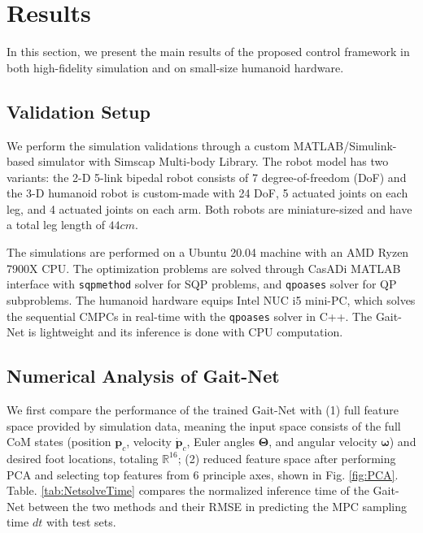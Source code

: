 \section{Results}
\label{sec:Results}

In this section, we present the main results of the proposed control framework in both high-fidelity simulation and on small-size humanoid hardware. 

\subsection{Validation Setup}
We perform the simulation validations through a custom MATLAB/Simulink-based simulator with Simscap Multi-body Library. The robot model has two variants: the 2-D 5-link bipedal robot consists of 7 degree-of-freedom (DoF) and the 3-D humanoid robot is custom-made with 24 DoF, 5 actuated joints on each leg, and 4 actuated joints on each arm. Both robots are miniature-sized and have a total leg length of $44 \unit{cm}$. 

The simulations are performed on a Ubuntu 20.04 machine with an AMD Ryzen 7900X CPU. The optimization problems are solved through CasADi \cite{Andersson2019} MATLAB interface with \texttt{sqpmethod} solver for SQP problems, and \texttt{qpoases} solver \cite{Ferreau2014} for QP subproblems. The humanoid hardware equips Intel NUC i5 mini-PC, which solves the sequential CMPCs in real-time with the \texttt{qpoases} solver in C++. The Gait-Net is lightweight and its inference is done with CPU computation.

\subsection{Numerical Analysis of Gait-Net}
We first compare the performance of the trained Gait-Net with (1) full feature space provided by simulation data, meaning the input space consists of the full CoM states (position $\bm p_c$, velocity $\dot{\bm p}_c$, Euler angles $\bm \Theta$, and angular velocity $\bm \omega$) and desired foot locations, totaling $\mathbb R^{16}$; (2) reduced feature space after performing PCA and selecting top features from 6 principle axes, shown in Fig. \ref{fig:PCA}. Table. \ref{tab:NetsolveTime} compares the normalized inference time of the Gait-Net between the two methods and their RMSE in predicting the MPC sampling time $dt$ with test sets. 

